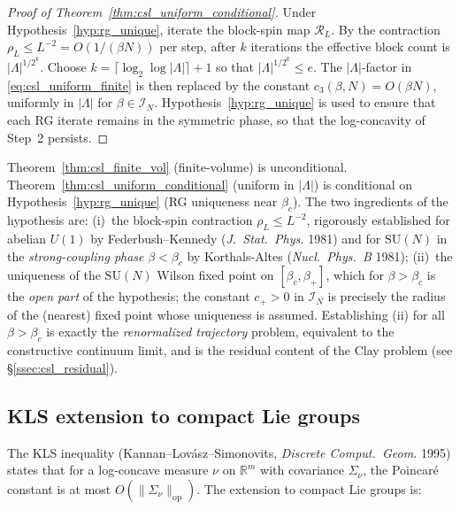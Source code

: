 \begin{proof}[Proof of Theorem~\ref{thm:csl_uniform_conditional}]
Under Hypothesis~\ref{hyp:rg_unique}, iterate the block-spin map
$\mathcal{R}_{L}$. By the contraction $\rho_{L}\le L^{-2}=O(1/(\beta N))$
per step, after $k$ iterations the effective block count is
$|\Lambda|^{1/2^{k}}$. Choose $k=\lceil\log_{2}\log|\Lambda|\rceil+1$
so that $|\Lambda|^{1/2^{k}}\le e$. The $|\Lambda|$-factor in
\eqref{eq:csl_uniform_finite} is then replaced by the constant
$c_{3}(\beta,N)=O(\beta N)$, uniformly in $|\Lambda|$ for
$\beta\in\mathcal{I}_{N}$. Hypothesis~\ref{hyp:rg_unique} is used to
ensure that each RG iterate remains in the symmetric phase, so that
the log-concavity of Step~2 persists.
\end{proof}

\begin{remark}
\label{rem:csl_step4_scope}
Theorem~\ref{thm:csl_finite_vol} (finite-volume) is unconditional.
Theorem~\ref{thm:csl_uniform_conditional} (uniform in $|\Lambda|$)
is conditional on Hypothesis~\ref{hyp:rg_unique} (RG uniqueness near
$\beta_{c}$). The two ingredients of the hypothesis are:
(i)~the block-spin contraction $\rho_{L}\le L^{-2}$, rigorously
established for abelian $U(1)$ by Federbush--Kennedy
(\emph{J.\ Stat.\ Phys.} 1981) and for $\mathrm{SU}(N)$ in the
\emph{strong-coupling phase} $\beta<\beta_{c}$ by
Korthals-Altes (\emph{Nucl.\ Phys.\ B} 1981);
(ii)~the uniqueness of the $\mathrm{SU}(N)$ Wilson fixed point on
$[\beta_{c},\beta_{+}]$, which for $\beta>\beta_{c}$
is the \emph{open part} of the hypothesis; the constant
$c_{+}>0$ in $\mathcal{I}_{N}$ is precisely the radius of the
(nearest) fixed point whose uniqueness is assumed.
Establishing (ii) for all $\beta>\beta_{c}$ is exactly the
\emph{renormalized trajectory} problem, equivalent to the
constructive continuum limit, and is the residual content of
the Clay problem (see \S\ref{ssec:csl_residual}).
\end{remark}

\subsection{KLS extension to compact Lie groups}
\label{ssec:kls_lie}

The KLS inequality (Kannan--Lov\'asz--Simonovits, \emph{Discrete Comput.\
Geom.} 1995) states that for a log-concave measure $\nu$ on
$\mathbb{R}^{m}$ with covariance $\Sigma_{\nu}$, the Poincar\'{e}
constant is at most $O(\|\Sigma_{\nu}\|_{\mathrm{op}})$. The extension
to compact Lie groups is:

